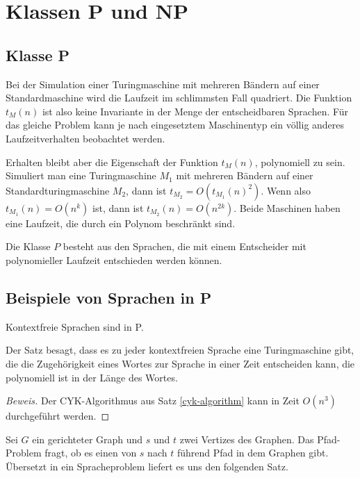 %
%
%
\section{Klassen P und NP}
%
\subsection{Klasse P}
Bei der Simulation einer Turingmaschine mit mehreren Bändern
auf einer Standardmaschine wird die Laufzeit im schlimmsten
Fall quadriert. Die Funktion $t_M(n)$ ist also keine Invariante
in der Menge der entscheidbaren Sprachen. Für das gleiche Problem kann
je nach eingesetztem Maschinentyp ein völlig anderes Laufzeitverhalten
beobachtet werden. 

Erhalten bleibt aber die Eigenschaft der Funktion $t_M(n)$, 
polynomiell zu sein. Simuliert man eine Turingmaschine $M_1$ mit
mehreren Bändern auf einer Standardturingmaschine $M_2$,
dann ist $t_{M_2}=O(t_{M_1}(n)^2)$.
Wenn also $t_{M_1}(n)=O(n^k)$ ist, dann ist $t_{M_2}(n)=O(n^{2k}).$
Beide Maschinen haben eine Laufzeit, die durch ein Polynom beschränkt
sind.

\begin{definition}
%
Die Klasse $P$ besteht aus den Sprachen, die mit einem Entscheider
mit polynomieller Laufzeit entschieden werden können.
\end{definition}

\subsection{Beispiele von Sprachen in P}
%
\begin{satz}
Kontextfreie Sprachen sind in P.
\end{satz}

Der Satz besagt, dass es zu jeder kontextfreien Sprache eine
Turingmaschine gibt, die die Zugehörigkeit eines Wortes zur
Sprache in einer Zeit entscheiden kann, die polynomiell ist in
der Länge des Wortes.

\begin{proof}[Beweis]
Der CYK-Algorithmus aus Satz \ref{cyk-algorithm}
kann in Zeit $O(n^3)$ durchgeführt werden.
\end{proof}

Sei $G$ ein gerichteter Graph und $s$ und $t$ zwei Vertizes
des Graphen. Das Pfad-Problem fragt, ob es einen von $s$ nach $t$
führend Pfad in dem Graphen gibt. Übersetzt in ein Spracheproblem
liefert es uns den folgenden Satz.

